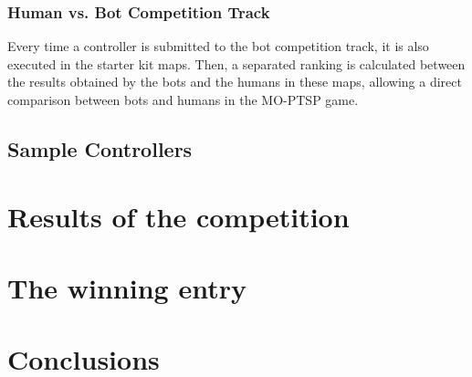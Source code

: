 \documentclass[conference]{IEEEtran}
\begin{document}
\subsubsection{Human vs. Bot Competition Track} Every time a controller is submitted to the bot competition track, it is also executed in the starter kit maps. Then, a separated ranking is calculated between the results obtained by the bots and the humans in these maps, allowing a direct comparison between bots and humans in the MO-PTSP game.

\subsection{Sample Controllers} \label{ssec:sample} 


\section{Results of the competition}


\section{The winning entry}


\section{Conclusions}




\end{document}
